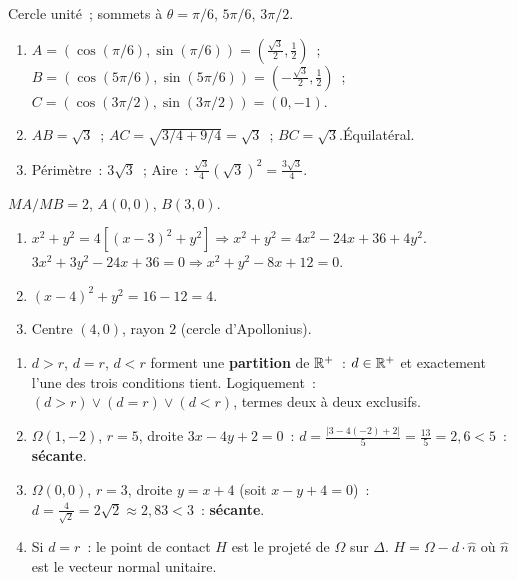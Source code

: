 
Cercle unit\'e~; sommets \`a $\theta=\pi/6$, $5\pi/6$, $3\pi/2$.
\begin{enumerate}
  \item $A=(\cos(\pi/6),\sin(\pi/6))=(\frac{\sqrt{3}}{2},\frac{1}{2})$~;
        $B=(\cos(5\pi/6),\sin(5\pi/6))=(-\frac{\sqrt{3}}{2},\frac{1}{2})$~;
        $C=(\cos(3\pi/2),\sin(3\pi/2))=(0,-1)$.
  \item $AB=\sqrt{3}$~; $AC=\sqrt{3/4+9/4}=\sqrt{3}$~; $BC=\sqrt{3}$.\checkmark\quad \'Equilat\'eral.
  \item P\'erim\`etre~: $3\sqrt{3}$~; Aire~: $\frac{\sqrt{3}}{4}(\sqrt{3})^2=\frac{3\sqrt{3}}{4}$.
\end{enumerate}


$MA/MB=2$, $A(0,0)$, $B(3,0)$.
\begin{enumerate}
  \item $x^2+y^2=4[(x-3)^2+y^2]\Rightarrow x^2+y^2=4x^2-24x+36+4y^2$.
        $3x^2+3y^2-24x+36=0\Rightarrow x^2+y^2-8x+12=0$.
  \item $(x-4)^2+y^2=16-12=4$.
  \item Centre $(4,0)$, rayon $2$ (cercle d'Apollonius).
\end{enumerate}


\begin{enumerate}
  \item $d>r$, $d=r$, $d<r$ forment une \textbf{partition} de $\mathbb{R}^+$~:
        $d\in\mathbb{R}^+$ et exactement l'une des trois conditions tient.
        Logiquement~: $(d>r)\vee(d=r)\vee(d<r)$, termes deux \`a deux exclusifs.
  \item $\Omega(1,-2)$, $r=5$, droite $3x-4y+2=0$~:
        $d=\frac{|3-4(-2)+2|}{5}=\frac{13}{5}=2{,}6<5$~: \textbf{s\'ecante}.
  \item $\Omega(0,0)$, $r=3$, droite $y=x+4$ (soit $x-y+4=0$)~:
        $d=\frac{4}{\sqrt{2}}=2\sqrt{2}\approx2{,}83<3$~: \textbf{s\'ecante}.
  \item Si $d=r$~: le point de contact $H$ est le projet\'e de $\Omega$ sur $\Delta$.
        $H=\Omega-d\cdot\hat{n}$ o\`u $\hat{n}$ est le vecteur normal unitaire.
\end{enumerate}

